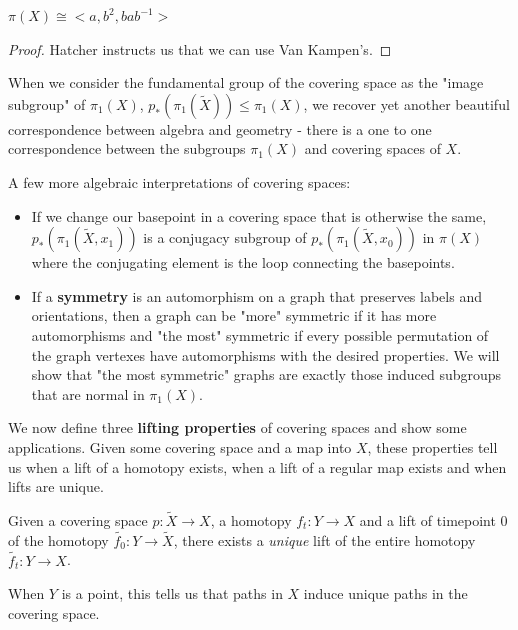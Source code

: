 \documentclass[10pt]{article}
\begin{document}
\begin{theorem}
	$\pi(X) \cong < a, b^2, bab^{-1} >$
\end{theorem}

\begin{proof}
Hatcher instructs us that we can use Van Kampen's.

\end{proof}

When we consider the fundamental group of the covering space as the "image
subgroup" of $\pi_1(X)$, $p_*(\pi_1(\tilde{X})) \leq \pi_1(X)$, we recover yet
another beautiful correspondence between algebra and geometry - there is a 
one to one correspondence between the subgroups $\pi_1(X)$ and covering spaces of $X$. 

A few more algebraic interpretations of covering spaces:

\begin{itemize}
	\item{If we change our basepoint in a covering space that is otherwise the
		same, $p_*(\pi_1(\tilde{X}, x_1))$ is a conjugacy subgroup of
		$p_*(\pi_1(\tilde{X}, x_0))$ in $\pi(X)$ where the conjugating element is the
	loop connecting the basepoints.}
\item{If a \textbf{symmetry} is an automorphism on a graph that preserves
		labels and orientations, then a graph can be "more" symmetric if it has
		more automorphisms and "the most" symmetric if every possible permutation
		of the graph vertexes have automorphisms with the desired properties. We
		will show that "the most symmetric" graphs are exactly those induced subgroups that
	are normal in $\pi_1(X)$.}
\end{itemize}

We now define three \textbf{lifting properties} of covering spaces and show
some applications. Given some covering space and a map into $X$, these
properties tell us when a lift of a homotopy exists, when a lift of a regular
map exists and when lifts are unique.

\begin{proposition}
	Given a covering space $p: \tilde{X} \to X$, a homotopy $f_t: Y \to X$ and a
	lift of timepoint 0 of the homotopy $\tilde{f_0}: Y \to \tilde{X}$, there
	exists a \textit{unique} lift of the entire homotopy $\tilde{f_t}: Y \to X$.
\end{proposition}

When $Y$ is a point, this tells us that paths in $X$ induce unique paths in the
covering space.
\end{document}
